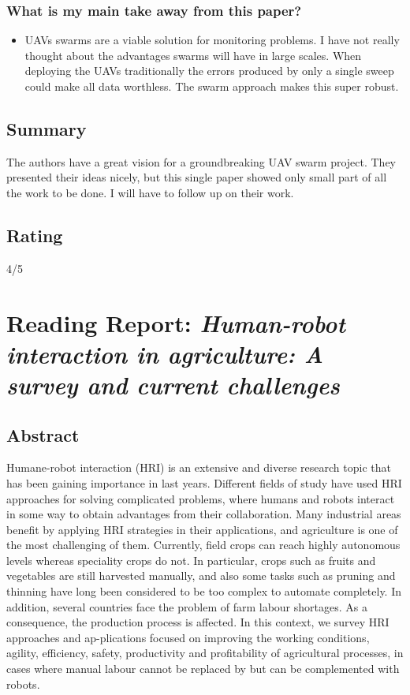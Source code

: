 \documentclass{article}
\begin{document}
\subsubsection*{What is my main take away from this paper?}
\begin{itemize}
    \item UAVs swarms are a viable solution for monitoring problems. I have not really thought about the advantages swarms will have in large scales. When deploying the UAVs traditionally the errors produced by only a single sweep could make all data worthless. The swarm approach makes this super robust.
\end{itemize}

\subsection*{Summary}
The authors have a great vision for a groundbreaking UAV swarm project. They presented their ideas nicely, but this single paper showed only small part of all the work to be done. I will have to follow up on their work.

\subsection*{Rating}
4/5

\section{Reading Report: \emph{Human-robot interaction in agriculture: A survey and current challenges}}
\cite{Vasconez2019}

\subsection*{Abstract}
Humane-robot interaction (HRI) is an extensive and diverse research topic that has been
gaining importance in last years. Different fields of study have used HRI approaches for
solving complicated problems, where humans and robots interact in some way to obtain
advantages from their collaboration. Many industrial areas benefit by applying HRI strategies in their applications, and agriculture is one of the most challenging of them.
Currently, field crops can reach highly autonomous levels whereas speciality crops do not.
In particular, crops such as fruits and vegetables are still harvested manually, and also
some tasks such as pruning and thinning have long been considered to be too complex to
automate completely. In addition, several countries face the problem of farm labour
shortages. As a consequence, the production process is affected. In this context, we survey
HRI approaches and ap-plications focused on improving the working conditions, agility,
efficiency, safety, productivity and profitability of agricultural processes, in cases where
manual labour cannot be replaced by but can be complemented with robots.
\end{document}
